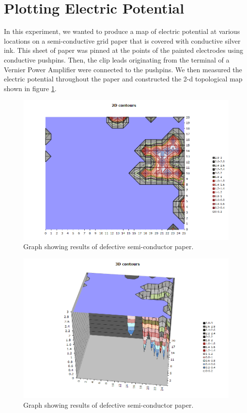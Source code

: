 \documentclass[oneside,12pt]{amsart}
\begin{document}
	\section{Plotting Electric Potential}
		In this experiment, we wanted to produce a map of electric potential at various locations on a semi-conductive grid paper that is covered with conductive silver ink. This sheet of paper was pinned at the points of the painted electrodes using conductive pushpins. Then, the clip leads originating from the terminal of a Vernier Power Amplifier were connected to the pushpins. We then measured the electric potential throughout the paper and constructed the 2-d topological map shown in figure \ref{2d}.\\
		
		\begin{figure}[h]
		 \includegraphics[width=\smallgraph,scale=0.01]{2d.png}
		\caption{Graph showing results of defective semi-conductor paper.}
		\label{2d}
		\end{figure}
	
		\begin{figure}[h]
		\includegraphics[width=\smallgraph,scale=0.01]{image.png}
		\caption{Graph showing results of defective semi-conductor paper.}
		\label{3d}
	\end{figure}
	
\end{document}

